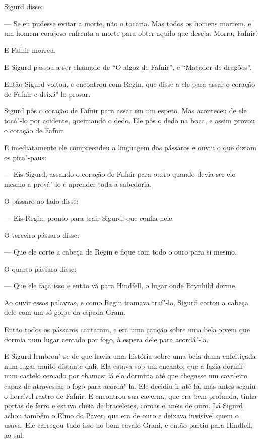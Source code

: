 Sigurd disse:

--- Se eu pudesse evitar a morte, não o tocaria. Mas todos os
homens morrem, e um homem corajoso enfrenta a morte para
obter aquilo que deseja. Morra, Fafnir! 

E Fafnir morreu. 

E Sigurd passou a ser chamado de “O algoz de Fafnir”, e “Matador de
dragões”. 

Então Sigurd voltou, e encontrou com Regin, que disse a ele para assar
o coração de Fafnir e deixá"-lo provar. 

Sigurd pôs o coração de Fafnir para assar em um espeto. Mas
aconteceu de ele tocá"-lo por acidente, queimando o dedo. Ele pôs o
dedo na boca, e assim provou o coração de Fafnir. 

E imediatamente ele compreendeu a linguagem dos pássaros e ouviu o
que diziam os pica"-paus:

--- Eis Sigurd, assando o coração de Fafnir para outro quando devia ser
ele mesmo a prová"-lo e aprender toda a sabedoria. 

O pássaro ao lado disse:

--- Eis Regin, pronto para trair Sigurd, que confia nele. 

O terceiro pássaro disse:

--- Que ele corte a cabeça de Regin e fique com todo o ouro para si
mesmo.

O quarto pássaro disse:

--- Que ele faça isso e então vá para Hindfell, o lugar onde Brynhild
dorme. 

Ao ouvir essas palavras, e como Regin tramava traí"-lo, Sigurd cortou a
cabeça dele com um só golpe da espada Gram.

Então todos os pássaros cantaram, e era uma canção sobre uma bela
jovem que dormia num lugar cercado por fogo, à espera dele para
acordá"-la. 

E Sigurd lembrou"-se de que havia uma história sobre uma bela dama
enfeitiçada num lugar muito distante dali. Ela estava sob um encanto,
que a fazia dormir num castelo cercado por chamas; lá ela dormiria
até que chegasse um cavaleiro capaz de atravessar o fogo para
acordá"-la. Ele decidiu ir até lá, mas antes seguiu o horrível rastro
de Fafnir. E encontrou sua caverna, que era bem profunda, tinha
portas de ferro e estava cheia de braceletes, coroas e anéis de
ouro. Lá Sigurd achou também o Elmo do Pavor, que era de ouro e
deixava invisível quem o usava. Ele carregou tudo isso no bom cavalo
Grani, e então partiu para Hindfell, ao sul. 

